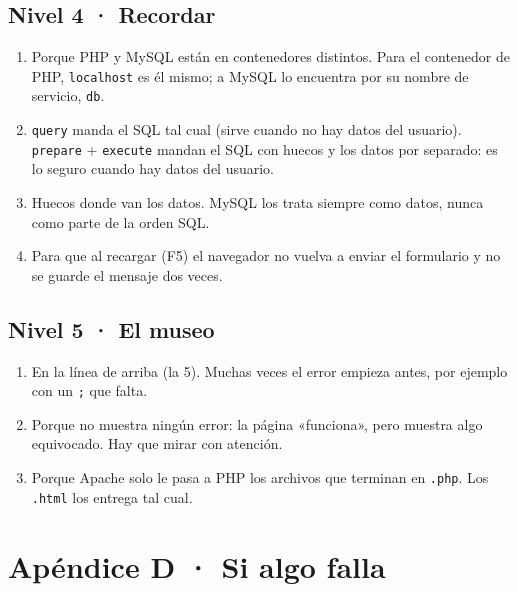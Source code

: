 \subsection*{Nivel 4 · Recordar}
\begin{enumerate}
  \item Porque PHP y MySQL están en contenedores distintos. Para el contenedor de PHP, \texttt{localhost} es él mismo; a MySQL lo encuentra por su nombre de servicio, \texttt{db}.
  \item \texttt{query} manda el SQL tal cual (sirve cuando no hay datos del usuario). \texttt{prepare} + \texttt{execute} mandan el SQL con huecos y los datos por separado: es lo seguro cuando hay datos del usuario.
  \item Huecos donde van los datos. MySQL los trata siempre como datos, nunca como parte de la orden SQL.
  \item Para que al recargar (F5) el navegador no vuelva a enviar el formulario y no se guarde el mensaje dos veces.
\end{enumerate}

\subsection*{Nivel 5 · El museo}
\begin{enumerate}
  \item En la línea de arriba (la 5). Muchas veces el error empieza antes, por ejemplo con un \texttt{;} que falta.
  \item Porque no muestra ningún error: la página «funciona», pero muestra algo equivocado. Hay que mirar con atención.
  \item Porque Apache solo le pasa a PHP los archivos que terminan en \texttt{.php}. Los \texttt{.html} los entrega tal cual.
\end{enumerate}

\clearpage
\renewcommand{\seccionactual}{APÉNDICE D · SI ALGO FALLA}
\section*{Apéndice D · Si algo falla}

